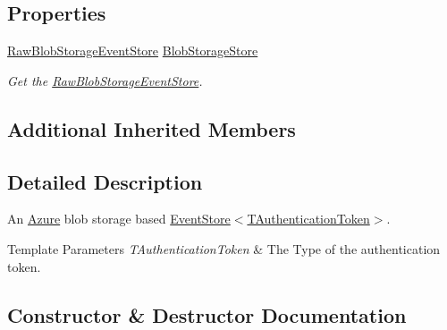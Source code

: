 \subsection*{Properties}
\begin{DoxyCompactItemize}
\item 
\hyperlink{classCqrs_1_1Azure_1_1BlobStorage_1_1Events_1_1BlobStorageEventStore_1_1RawBlobStorageEventStore}{Raw\+Blob\+Storage\+Event\+Store} \hyperlink{classCqrs_1_1Azure_1_1BlobStorage_1_1Events_1_1BlobStorageEventStore_a85b9d71c130e5748886a61d80447116d_a85b9d71c130e5748886a61d80447116d}{Blob\+Storage\+Store}
\begin{DoxyCompactList}\small\item\em Get the \hyperlink{classCqrs_1_1Azure_1_1BlobStorage_1_1Events_1_1BlobStorageEventStore_1_1RawBlobStorageEventStore}{Raw\+Blob\+Storage\+Event\+Store}. \end{DoxyCompactList}\end{DoxyCompactItemize}
\subsection*{Additional Inherited Members}


\subsection{Detailed Description}
An \hyperlink{namespaceCqrs_1_1Azure}{Azure} blob storage based \hyperlink{classCqrs_1_1Events_1_1EventStore_a6346cb2aea4c5b4e740dc6cfb15abab8_a6346cb2aea4c5b4e740dc6cfb15abab8}{Event\+Store$<$\+T\+Authentication\+Token$>$}. 


\begin{DoxyTemplParams}{Template Parameters}
{\em T\+Authentication\+Token} & The Type of the authentication token.\\
\hline
\end{DoxyTemplParams}


\subsection{Constructor \& Destructor Documentation}
\mbox{\label{classCqrs_1_1Azure_1_1BlobStorage_1_1Events_1_1BlobStorageEventStore_a04ce4516e7e1d30339d3f04ba54abe54_a04ce4516e7e1d30339d3f04ba54abe54}} 
